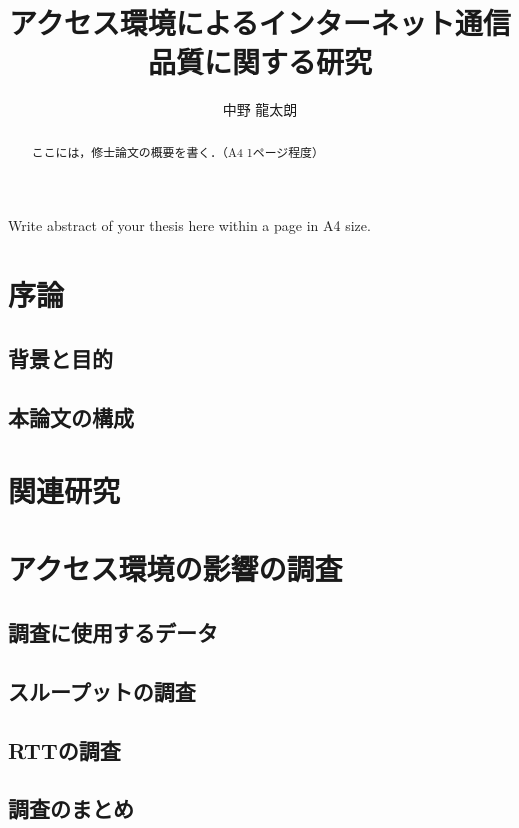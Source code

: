 \documentclass[12pt]{mthesis_utf8}\usepackage{graphicx}
\title{アクセス環境によるインターネット通信品質に関する研究}
\author{中野 龍太朗}
\begin{document}
\maketitle
\begin{abstract}
ここには，修士論文の概要を書く．（A4 1ページ程度）
\end{abstract}

\begin{eabstract}
Write abstract of your thesis here within a page in A4 size.
\end{eabstract}



\chapter{序論}
\section{背景と目的}


\section{本論文の構成}


\chapter{関連研究}

\chapter{アクセス環境の影響の調査}
\section{調査に使用するデータ}
\section{スループットの調査}
\section{RTTの調査}
\section{調査のまとめ}
\end{document}
